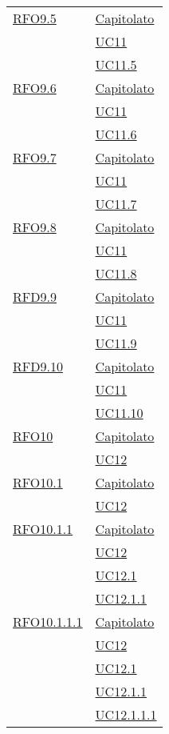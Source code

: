 \begin{longtable}{|>{\centering}m{5cm}|m{5cm}<{\centering}|}
      \hyperlink{RFO9.5}{RFO9.5} & \hyperlink{Capitolato}{Capitolato}\\
  & \hyperref[UC11]{UC11}\\
  & \hyperref[UC11.5]{UC11.5}\\\hline
  
      \hyperlink{RFO9.6}{RFO9.6} & \hyperlink{Capitolato}{Capitolato}\\
  & \hyperref[UC11]{UC11}\\
  & \hyperref[UC11.6]{UC11.6}\\\hline
  
    \hyperlink{RFO9.7}{RFO9.7} & \hyperlink{Capitolato}{Capitolato}\\
  & \hyperref[UC11]{UC11}\\
  & \hyperref[UC11.7]{UC11.7}\\\hline

  \hyperlink{RFO9.8}{RFO9.8} & \hyperlink{Capitolato}{Capitolato}\\
& \hyperref[UC11]{UC11}\\
& \hyperref[UC11.8]{UC11.8}\\\hline

  \hyperlink{RFD9.9}{RFD9.9} & \hyperlink{Capitolato}{Capitolato}\\
& \hyperref[UC11]{UC11}\\
& \hyperref[UC11.9]{UC11.9}\\\hline

  \hyperlink{RFD9.10}{RFD9.10} & \hyperlink{Capitolato}{Capitolato}\\
& \hyperref[UC11]{UC11}\\
& \hyperref[UC11.10]{UC11.10}\\\hline

  \hyperlink{RFO10}{RFO10} & \hyperlink{Capitolato}{Capitolato}\\
& \hyperref[UC12]{UC12}\\\hline

 \hyperlink{RFO10.1}{RFO10.1} & \hyperlink{Capitolato}{Capitolato}\\
& \hyperref[UC12]{UC12}\\\hline

 \hyperlink{RFO10.1.1}{RFO10.1.1} & \hyperlink{Capitolato}{Capitolato}\\
& \hyperref[UC12]{UC12}\\
& \hyperref[UC12.1]{UC12.1}\\
& \hyperref[UC12.1.1]{UC12.1.1}\\\hline

 \hyperlink{RFO10.1.1.1}{RFO10.1.1.1} & \hyperlink{Capitolato}{Capitolato}\\
& \hyperref[UC12]{UC12}\\
& \hyperref[UC12.1]{UC12.1}\\
& \hyperref[UC12.1.1]{UC12.1.1}\\
& \hyperref[UC12.1.1.1]{UC12.1.1.1}\\\hline


\end{longtable}
